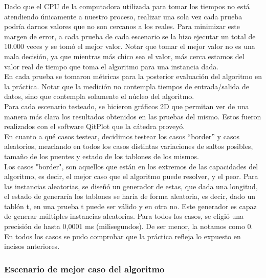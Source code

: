 \noindent Dado que el CPU de la computadora utilizada para tomar los tiempos no está atendiendo únicamente a nuestro proceso, realizar una sola vez cada prueba podría darnos valores que no son cercanos a los reales. Para minimizar este margen de error, a cada prueba de cada escenario se la hizo ejecutar un total de 10.000 veces y se tomó el mejor valor. Notar que tomar el mejor valor no es una mala decisión, ya que mientras más chico sea el valor, más cerca estamos del valor real de tiempo que toma el algoritmo para una instancia dada.\\

\noindent En cada prueba se tomaron métricas para la posterior evaluación del algoritmo en la práctica. Notar que la medición no contempla tiempos de entrada/salida de datos, sino que contempla solamente el núcleo del algoritmo.\\

\noindent Para cada escenario testeado, se hicieron gráficos 2D que permitan ver de una manera más clara los resultados obtenidos en las pruebas del mismo. Estos fueron realizados con el software QitPlot que la cátedra proveyó.\\

\noindent En cuanto a qué casos testear, decidimos testear los casos “border” y casos aleatorios, mezclando en todos los casos distintas variaciones de saltos posibles, tamaño de los puentes y estado de los tablones de los mismos.\\

\noindent Los casos "border", son aquellos que están en los extremos de las capacidades del algoritmo, es decir, el mejor caso que el algoritmo puede resolver, y el peor. 
Para las instancias aleatorias, se diseñó un generador de estas, que dada una longitud, el estado de generaría los tablones se haría de forma aleatoria, es decir, dado un tablón t, en una prueba t puede ser válido y en otra no.  Este generador es capaz de generar múltiples instancias aleatorias.
Para todos los casos, se eligió una precisión de hasta 0,0001 ms (milisegundos). De ser menor, la notamos como 0.\\

\noindent En todos los casos se pudo comprobar que la práctica refleja lo expuesto en incisos anteriores.

\newpage \subsubsection{Escenario de mejor caso del algoritmo}

